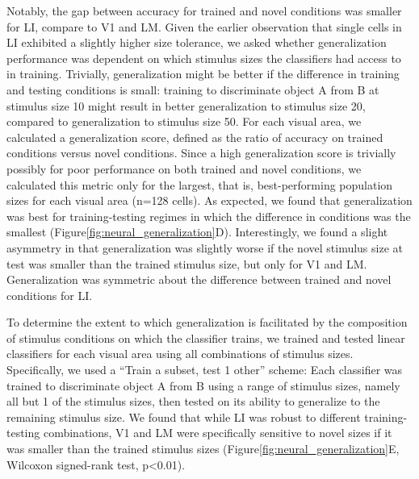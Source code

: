 Notably, the gap between accuracy for trained and novel conditions was smaller for LI, compare to V1 and LM. Given the earlier observation that single cells in LI exhibited a slightly higher size tolerance, we asked whether generalization performance was dependent on which stimulus sizes the classifiers had access to in training. Trivially, generalization might be better if the difference in training and testing conditions is small: training to discriminate object A from B at stimulus size 10 might result in better generalization to stimulus size 20, compared to generalization to stimulus size 50. For each visual area, we calculated a generalization score, defined as the ratio of accuracy on trained conditions versus novel conditions. Since a high generalization score is trivially possibly for poor performance on both trained and novel conditions, we calculated this metric only for the largest, that is, best-performing population sizes for each visual area (n=128 cells). As expected, we found that generalization was best for training-testing regimes in which the difference in conditions was the smallest (Figure\ref{fig:neural_generalization}D). Interestingly, we found a slight asymmetry in that generalization was slightly worse if the novel stimulus size at test was smaller than the trained stimulus size, but only for V1 and LM. Generalization was symmetric about the difference between trained and novel conditions for LI.

To determine the extent to which generalization is facilitated by the composition of stimulus conditions on which the classifier trains, we trained and tested linear classifiers for each visual area using all combinations of stimulus sizes. Specifically, we used a “Train a subset, test 1 other” scheme:  Each classifier was trained to discriminate object A from B using a range of stimulus sizes, namely all but 1 of the stimulus sizes, then tested on its ability to generalize to the remaining stimulus size. We found that while LI was robust to different training-testing combinations, V1 and LM were specifically sensitive to novel sizes if it was smaller than the trained stimulus sizes (Figure\ref{fig:neural_generalization}E, Wilcoxon signed-rank test, p<0.01). 

